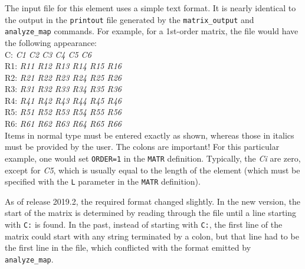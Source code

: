 The input file for this element uses a simple text format.  It is nearly identical
to the output in the {\tt printout} file generated by the {\tt matrix\_output}
and {\tt analyze_map} commands.  For example, for a 1st-order matrix, the file would have the
following appearance:\\
C: {\em C1 C2 C3 C4 C5 C6}\\
R1: {\em R11 R12 R13 R14 R15 R16}\\
R2: {\em R21 R22 R23 R24 R25 R26}\\
R3: {\em R31 R32 R33 R34 R35 R36}\\
R4: {\em R41 R42 R43 R44 R45 R46}\\
R5: {\em R51 R52 R53 R54 R55 R56}\\
R6: {\em R61 R62 R63 R64 R65 R66}\\

Items in normal type must be entered exactly as shown, whereas those in
italics must be provided by the user.  The colons are important!
For this particular example, one would set {\tt ORDER=1} in the {\tt MATR}
definition.  Typically, the {\em Ci} are zero, except for {\em C5}, which
is usually equal to the length of the element (which must be specified with
the {\tt L} parameter in the {\tt MATR} definition).

As of release 2019.2, the required format changed slightly. 
In the new version, the start of the matrix is determined by reading through the file until 
a line starting with \verb|C:| is found.
In the past, 
instead of starting with \verb|C:|, the first line of the matrix could start
with any string terminated by a colon, but that line had to be the first line in the
file, which conflicted with the format emitted by \verb|analyze_map|.
